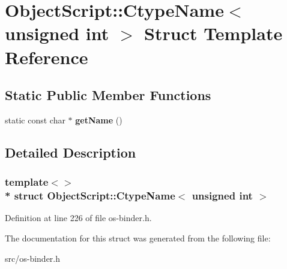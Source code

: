 \hypertarget{struct_object_script_1_1_ctype_name_3_01unsigned_01int_01_4}{}\section{Object\+Script\+:\+:Ctype\+Name$<$ unsigned int $>$ Struct Template Reference}
\label{struct_object_script_1_1_ctype_name_3_01unsigned_01int_01_4}
\subsection*{Static Public Member Functions}
\begin{DoxyCompactItemize}
\item 
static const char $\ast$ {\bfseries get\+Name} ()\hypertarget{struct_object_script_1_1_ctype_name_3_01unsigned_01int_01_4_ab2d846d8e7fce6f7a679afcb330ea6cc}{}\label{struct_object_script_1_1_ctype_name_3_01unsigned_01int_01_4_ab2d846d8e7fce6f7a679afcb330ea6cc}

\end{DoxyCompactItemize}


\subsection{Detailed Description}
\subsubsection*{template$<$$>$\\*
struct Object\+Script\+::\+Ctype\+Name$<$ unsigned int $>$}



Definition at line 226 of file os-\/binder.\+h.



The documentation for this struct was generated from the following file\+:\begin{DoxyCompactItemize}
\item 
src/os-\/binder.\+h\end{DoxyCompactItemize}
